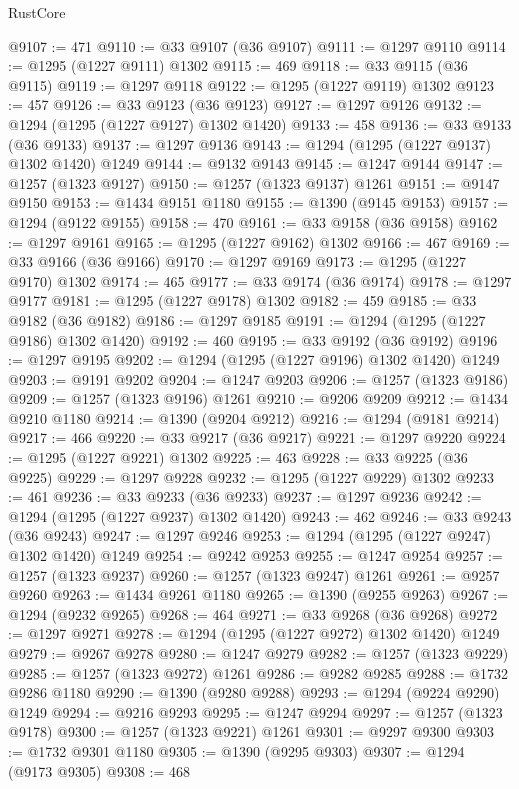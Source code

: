 \begin{lexlean}{RustCore}
\begin{coremodule}
@9107 := 471
@9110 := @33 @9107 (@36 @9107)
@9111 := @1297 @9110
@9114 := @1295 (@1227 @9111) @1302
@9115 := 469
@9118 := @33 @9115 (@36 @9115)
@9119 := @1297 @9118
@9122 := @1295 (@1227 @9119) @1302
@9123 := 457
@9126 := @33 @9123 (@36 @9123)
@9127 := @1297 @9126
@9132 := @1294 (@1295 (@1227 @9127) @1302 @1420)
@9133 := 458
@9136 := @33 @9133 (@36 @9133)
@9137 := @1297 @9136
@9143 := @1294 (@1295 (@1227 @9137) @1302 @1420) @1249
@9144 := @9132 @9143
@9145 := @1247 @9144
@9147 := @1257 (@1323 @9127)
@9150 := @1257 (@1323 @9137) @1261
@9151 := @9147 @9150
@9153 := @1434 @9151 @1180
@9155 := @1390 (@9145 @9153)
@9157 := @1294 (@9122 @9155)
@9158 := 470
@9161 := @33 @9158 (@36 @9158)
@9162 := @1297 @9161
@9165 := @1295 (@1227 @9162) @1302
@9166 := 467
@9169 := @33 @9166 (@36 @9166)
@9170 := @1297 @9169
@9173 := @1295 (@1227 @9170) @1302
@9174 := 465
@9177 := @33 @9174 (@36 @9174)
@9178 := @1297 @9177
@9181 := @1295 (@1227 @9178) @1302
@9182 := 459
@9185 := @33 @9182 (@36 @9182)
@9186 := @1297 @9185
@9191 := @1294 (@1295 (@1227 @9186) @1302 @1420)
@9192 := 460
@9195 := @33 @9192 (@36 @9192)
@9196 := @1297 @9195
@9202 := @1294 (@1295 (@1227 @9196) @1302 @1420) @1249
@9203 := @9191 @9202
@9204 := @1247 @9203
@9206 := @1257 (@1323 @9186)
@9209 := @1257 (@1323 @9196) @1261
@9210 := @9206 @9209
@9212 := @1434 @9210 @1180
@9214 := @1390 (@9204 @9212)
@9216 := @1294 (@9181 @9214)
@9217 := 466
@9220 := @33 @9217 (@36 @9217)
@9221 := @1297 @9220
@9224 := @1295 (@1227 @9221) @1302
@9225 := 463
@9228 := @33 @9225 (@36 @9225)
@9229 := @1297 @9228
@9232 := @1295 (@1227 @9229) @1302
@9233 := 461
@9236 := @33 @9233 (@36 @9233)
@9237 := @1297 @9236
@9242 := @1294 (@1295 (@1227 @9237) @1302 @1420)
@9243 := 462
@9246 := @33 @9243 (@36 @9243)
@9247 := @1297 @9246
@9253 := @1294 (@1295 (@1227 @9247) @1302 @1420) @1249
@9254 := @9242 @9253
@9255 := @1247 @9254
@9257 := @1257 (@1323 @9237)
@9260 := @1257 (@1323 @9247) @1261
@9261 := @9257 @9260
@9263 := @1434 @9261 @1180
@9265 := @1390 (@9255 @9263)
@9267 := @1294 (@9232 @9265)
@9268 := 464
@9271 := @33 @9268 (@36 @9268)
@9272 := @1297 @9271
@9278 := @1294 (@1295 (@1227 @9272) @1302 @1420) @1249
@9279 := @9267 @9278
@9280 := @1247 @9279
@9282 := @1257 (@1323 @9229)
@9285 := @1257 (@1323 @9272) @1261
@9286 := @9282 @9285
@9288 := @1732 @9286 @1180
@9290 := @1390 (@9280 @9288)
@9293 := @1294 (@9224 @9290) @1249
@9294 := @9216 @9293
@9295 := @1247 @9294
@9297 := @1257 (@1323 @9178)
@9300 := @1257 (@1323 @9221) @1261
@9301 := @9297 @9300
@9303 := @1732 @9301 @1180
@9305 := @1390 (@9295 @9303)
@9307 := @1294 (@9173 @9305)
@9308 := 468

\end{coremodule}
\end{lexlean}

